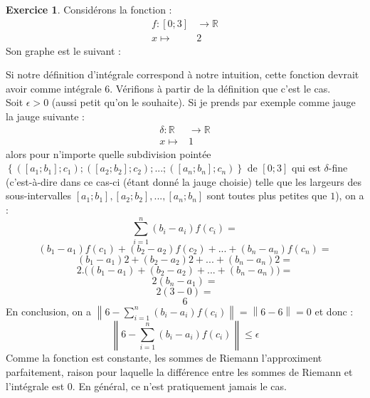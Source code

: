\documentclass[a4paper,fontsize=13pt]{scrreprt}
\theoremstyle{plain}
\theoremstyle{definition}
\newtheorem{exo}[subsection]{Exercice}
\newcommand{\rr}{\mathbb{R}}
\newcommand {\axes} {
	\draw[thick, ->] (\xmin,0) -- (\xmax+1,0);
	\draw[thick, ->] (0,\ymin) -- (0,\ymax+1);
	\draw (0,\ymax+0.5) node [left] {$y$};
	\draw (\xmax+0.5, 0) node [below] {$x$};
	\draw[thick] (-0.15,1)--(0.15,1) (1,-0.15)--(1,0.15);
	\draw (0,1)node[left]{$1$} (1,0)node[below]{$1$};
}
\begin{document}
\begin{exo}
Considérons la fonction :
\begin{align*}
f : [0;3] &\to \rr \\
x \mapsto & 2
\end{align*}
Son graphe est le suivant :
\begin{center}
\end{center} \newpage
Si notre définition d'intégrale correspond à notre intuition, cette fonction devrait avoir comme intégrale $6$. Vérifions à partir de la définition que c'est le cas. \\
Soit $\epsilon > 0$ (aussi petit qu'on le souhaite). Si je prends par exemple comme jauge la jauge suivante :
\begin{align*}
\delta : \rr &\to \rr \\
x \mapsto & 1
\end{align*}
alors pour n'importe quelle subdivision pointée $\left\{([a_1;b_1];c_1);([a_2;b_2];c_2);...;([a_n;b_n];c_n)\right\}$ de $[0;3]$ qui est $\delta$-fine (c'est-à-dire dans ce cas-ci (étant donné la jauge choisie) telle que les largeurs des sous-intervalles $[a_1;b_1],[a_2;b_2],...,[a_n;b_n]$ sont toutes plus petites que $1$), on a :
$$\sum\limits_{i=1}^{n} (b_i - a_i) f(c_i) ={}$$
$$ (b_1 - a_1)f(c_1) + (b_2 - a_2)f(c_2) + ... + (b_n - a_n)f(c_n) = {}$$
$$ (b_1 - a_1)2 + (b_2 - a_2)2 + ... + (b_n - a_n)2 = {}$$
$$2. \Big( (b_1 - a_1) + (b_2 - a_2) + ... + (b_n - a_n) \Big) = {}$$
$$2(b_n - a_1) = {}$$
$$ 2(3-0)={}$$
$$6$$
En conclusion, on a $\left\|6 - \sum\limits_{i=1}^{n} (b_i - a_i) f(c_i) \right\| = \left\|6 - 6 \right\| = 0$ et donc :
$$\left\|6 - \sum\limits_{i=1}^{n} (b_i - a_i) f(c_i) \right\| \le \epsilon$$
Comme la fonction est constante, les sommes de Riemann l'approximent parfaitement, raison pour laquelle la différence entre les sommes de Riemann et l'intégrale est $0$. En général, ce n'est pratiquement jamais le cas.
\end{exo}
\newpage
\end{document}
